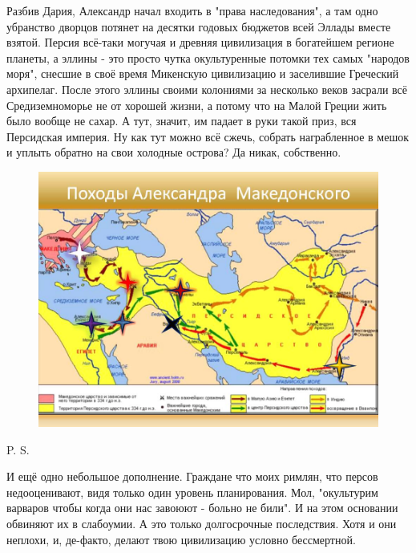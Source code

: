 Разбив Дария, Александр начал входить в "права наследования", а там одно убранство дворцов потянет на десятки годовых бюджетов всей Эллады вместе взятой. Персия всё-таки могучая и древняя цивилизация в богатейшем регионе планеты, а эллины - это просто чутка окультуренные потомки тех самых "народов моря", снесшие в своё время Микенскую цивилизацию и заселившие Греческий архипелаг. После этого эллины своими колониями за несколько веков засрали всё Средиземноморье не от хорошей жизни, а потому что на Малой Греции жить было вообще не сахар. А тут, значит, им падает в руки такой приз, вся Персидская империя. Ну как тут можно всё сжечь, собрать награбленное в мешок и уплыть обратно на свои холодные острова? Да никак, собственно.

\begin{figure}[h!tb] 
	\centering\includegraphics[scale=0.3]{MakedoskiyShort/160153850911471969.png}
\end{figure}




P. S.

И ещё одно небольшое дополнение. Граждане что моих римлян, что персов недооценивают, видя только один уровень планирования. Мол, "окультурим варваров чтобы когда они нас завоюют - больно не били". И на этом основании обвиняют их в слабоумии. А это только долгосрочные последствия. Хотя и они неплохи, и, де-факто, делают твою цивилизацию условно бессмертной.


